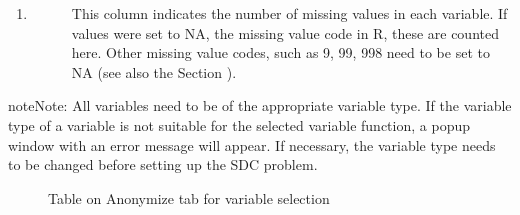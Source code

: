 \documentclass[letterpaper,10pt,english]{sphinxmanual}
\begin{document}
\begin{enumerate}
\begin{description}
\end{description}

\item {} \begin{description}
\item[{}] \leavevmode
This column indicates the number of missing values in each variable.
If values were set to NA, the missing value code in R, these are counted here. Other
missing value codes, such as 9, 99, 998 need to be set to NA
(see also the Section ).

\end{description}

\end{enumerate}

\begin{sphinxadmonition}{note}{Note:}
All variables need to be of the appropriate variable type. If the variable type of a
variable is not suitable for the selected variable function, a popup window with an error
message will appear. If necessary, the variable type needs to be changed before setting up the SDC
problem.
\end{sphinxadmonition}

\begin{figure}[htbp]
\centering
\capstart

\noindent{}
\caption{Table on Anonymize tab for variable selection}\label{\detokenize{setup:fig11}}\label{\detokenize{setup:id1}}\end{figure}
\end{document}
